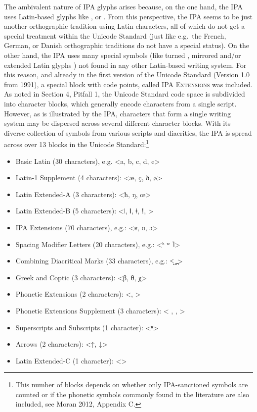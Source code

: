 The ambivalent nature of IPA glyphs arises because, on the one hand, the IPA
uses Latin-based glyphs like , or . From this perspective, the IPA seems to be
just another orthographic tradition using Latin characters, all of which do not
get a special treatment within the Unicode Standard (just like e.g.~the French,
German, or Danish orthographic traditions do not have a special status). On the
other hand, the IPA uses many special symbols (like turned , mirrored and/or
extended Latin glyphs ) not found in any other Latin-based writing system. For
this reason, and already in the first version of the Unicode Standard (Version
1.0 from 1991), a special block with code points, called \textsc{IPA Extensions}
was included. As noted in Section 4, Pitfall 1, the Unicode Standard code space
is subdivided into character blocks, which generally encode characters from a
single script. However, as is illustrated by the IPA, characters that form a
single writing system may be dispersed across several different character
blocks. With its diverse collection of symbols from various scripts and
diacritics, the IPA is spread across over 13 blocks in the Unicode
Standard:\footnote{This number of blocks depends on whether only IPA-sanctioned
symbols are counted or if the phonetic symbols commonly found in the literature
are also included, see Moran 2012, Appendix C.}

\begin{itemize}
	\item Basic Latin (30 characters), e.g. <a, b, c, d, e> \item Latin-1
	Supplement (4 characters): <æ, ç, ð, ø\textgreater{} \item Latin
	Extended-A (3 characters): <ħ, ŋ, œ> \item Latin Extended-B (5
	characters): <ǀ, ǁ, ǂ, ǃ, > \item IPA Extensions (70 characters), e.g.:
	<ɐ, ɑ, ɔ> \item Spacing Modifier Letters (20 characters), e.g.: <ʰ ʷ ˥>
	\item Combining Diacritical Marks (33 characters), e.g.: <̝ ̥ ̪> \item
	Greek and Coptic (3 characters): <β, θ, χ> \item Phonetic Extensions (2
	characters): <, > \item Phonetic Extensions Supplement (3 characters): <
	, , > \item Superscripts and Subscripts (1 character): <ⁿ> \item Arrows
	(2 characters): \textless{}↑, ↓\textgreater{} \item Latin Extended-C (1
	character): <>
\end{itemize}


